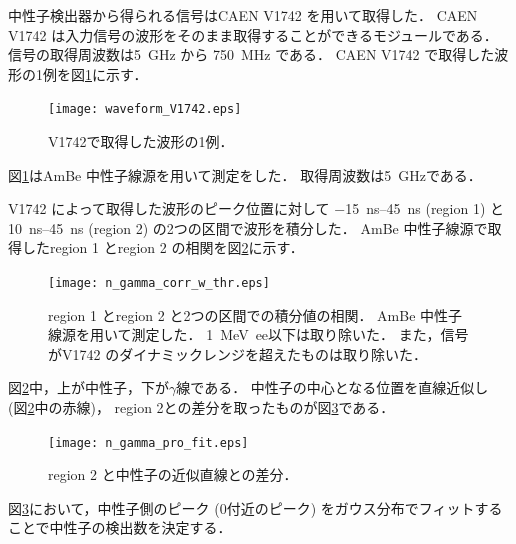 \documentclass[../master]{subfiles}
\begin{document}
中性子検出器から得られる信号はCAEN V1742 を用いて取得した．
CAEN V1742 は入力信号の波形をそのまま取得することができるモジュールである．
信号の取得周波数は\SI{5}{\giga\hertz} から \SI{750}{\mega\hertz} である．
CAEN V1742 で取得した波形の1例を図\ref{fig::waveform_V1742}に示す．
\begin{figure}
  \centering
  \texttt{[image: waveform\_V1742.eps]}
  \caption{V1742で取得した波形の1例．}
  \label{fig::waveform_V1742}
\end{figure}
図\ref{fig::waveform_V1742}はAmBe 中性子線源を用いて測定をした．
取得周波数は\SI{5}{\giga\hertz}である．

V1742 によって取得した波形のピーク位置に対して
\SIrange{-15}{45}{\nano\second} (region 1) と\SIrange{10}{45}{\nano\second} (region 2) の2つの区間で波形を積分した．
AmBe 中性子線源で取得したregion 1 とregion 2 の相関を図\ref{fig::n_gamma_correlation}に示す．
\begin{figure}
  \centering
  \texttt{[image: n\_gamma\_corr\_w\_thr.eps]}
  \caption[region 1 とregion 2 と2つの区間での積分値の相関．]
          {region 1 とregion 2 と2つの区間での積分値の相関．
            AmBe 中性子線源を用いて測定した．
            \SI{1}{\mega\electronvolt ee}以下は取り除いた．
            また，信号がV1742 のダイナミックレンジを超えたものは取り除いた．}
  \label{fig::n_gamma_correlation}
\end{figure}
図\ref{fig::n_gamma_correlation}中，上が中性子，下が$\gamma$線である．
中性子の中心となる位置を直線近似し (図\ref{fig::n_gamma_correlation}中の赤線)，
region 2との差分を取ったものが図\ref{fig::n_gamma_projection}である．
\begin{figure}
  \centering
  \texttt{[image: n\_gamma\_pro\_fit.eps]}
  \caption{region 2 と中性子の近似直線との差分．}
  \label{fig::n_gamma_projection}
\end{figure}
図\ref{fig::n_gamma_projection}において，中性子側のピーク (0付近のピーク)
をガウス分布でフィットすることで中性子の検出数を決定する．

\end{document}
